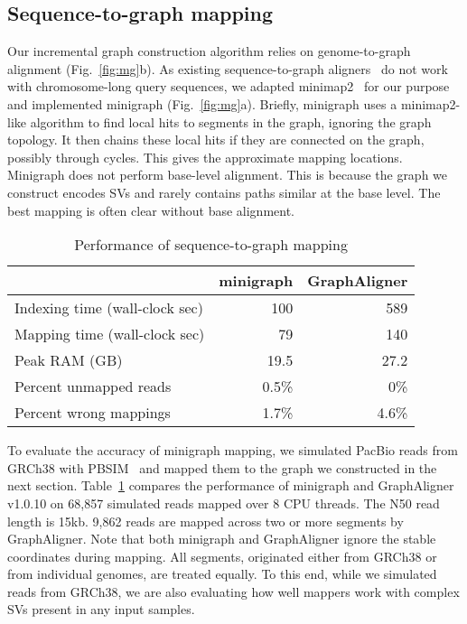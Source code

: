\documentclass[twocolumn]{bmcart}
\begin{document}
\subsection*{Sequence-to-graph mapping}

Our incremental graph construction algorithm relies on genome-to-graph
alignment (Fig.~\ref{fig:mg}b). As existing sequence-to-graph
aligners~\cite{Rautiainen810812,Garrison:2018aa} do not work with
chromosome-long query sequences, we adapted minimap2~\cite{Li:2018ab} for our
purpose and implemented minigraph (Fig.~\ref{fig:mg}a). Briefly, minigraph uses
a minimap2-like algorithm to find local hits to segments in the graph, ignoring
the graph topology. It then chains these local hits if they are connected on
the graph, possibly through cycles. This gives the approximate mapping locations. Minigraph does not
perform base-level alignment. This is because the graph we construct encodes
SVs and rarely contains paths similar at the base level. The best mapping is
often clear without base alignment.

\begin{table}[b]
\caption{Performance of sequence-to-graph mapping}\label{tab:mgvga}
\begin{tabular}{lrr}
\hline
& minigraph & GraphAligner \\
\hline
Indexing time (wall-clock sec) & 100 & 589 \\
Mapping time (wall-clock sec) & 79 & 140 \\
Peak RAM (GB)          & 19.5 & 27.2 \\
Percent unmapped reads & 0.5\% & 0\% \\
Percent wrong mappings & 1.7\% & 4.6\% \\
\hline
\end{tabular}
\end{table}

To evaluate the accuracy of minigraph mapping, we simulated PacBio reads from
GRCh38 with PBSIM~\cite{Ono:2013aa} and mapped them to the graph we constructed
in the next section. Table~\ref{tab:mgvga} compares the performance of
minigraph and GraphAligner~\cite{Rautiainen810812} v1.0.10 on 68,857 simulated
reads mapped over 8 CPU threads. {\color{black} The N50 read length is 15kb.
9,862 reads are mapped across two or more segments by GraphAligner. Note that
both minigraph and GraphAligner ignore the stable coordinates during mapping.
All segments, originated either from GRCh38 or from individual genomes, are
treated equally. To this end, while we simulated reads from GRCh38, we are also
evaluating how well mappers work with complex SVs present in any input
samples.}
\end{document}

